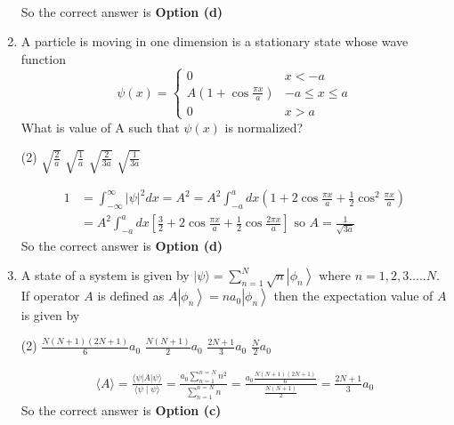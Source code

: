 \begin{enumerate}
\begin{answer}
$$\begin{aligned}
\end{aligned}
$$
So the correct answer is \textbf{Option (d)}
\end{answer}
\item A particle is moving in one dimension is a stationary state whose wave function
$$
\psi(x)=\left\{\begin{array}{lc}
0 & x<-a \\
A\left(1+\cos \frac{\pi x}{a}\right) & -a \leq x \leq a \\
0 & x>a
\end{array}\right.
$$
What is value of A such that $\psi(x)$ is normalized?
 \begin{tasks}(2)
	\task[\textbf{a.}] $\sqrt{\frac{2}{a}}$
	\task[\textbf{b.}]$\sqrt{\frac{1}{a}}$
	\task[\textbf{c.}] $\sqrt{\frac{2}{3 a}}$
	\task[\textbf{d.}] $\sqrt{\frac{1}{3 a}}$
\end{tasks}
\begin{answer}
	$$
	\begin{aligned}
	1&=\int_{-\infty}^{\infty}|\psi|^{2} d x=A^{2}=A^{2} \int_{-a}^{a} d x\left(1+2 \cos \frac{\pi x}{a}+\frac{1}{2} \cos ^{2} \frac{\pi x}{a}\right)\\
	&=A^{2} \int_{-a}^{a} d x\left[\frac{3}{2}+2 \cos \frac{\pi x}{a}+\frac{1}{2} \cos \frac{2 \pi x}{a}\right] \text { so } A=\frac{1}{\sqrt{3 a}}
\end{aligned}
$$
So the correct answer is \textbf{Option (d)}
\end{answer}
\item A state of a system is given by $|\psi\rangle=\sum_{n=1}^{N} \sqrt{n}\left|\phi_{n}\right\rangle$ where $n=1,2,3 \ldots . . N$. If operator $A$ is defined as $A\left|\phi_{n}\right\rangle=n a_{0}\left|\phi_{n}\right\rangle$ then the expectation value of $A$ is given by
 \begin{tasks}(2)
	\task[\textbf{a.}]$\frac{N(N+1)(2 N+1)}{6} a_{0}$
	\task[\textbf{b.}]$\frac{N(N+1)}{2} a_{0}$
	\task[\textbf{c.}]$\frac{2 N+1}{3} a_{0}$
	\task[\textbf{d.}]$\frac{N}{2} a_{0}$ 
\end{tasks}
\begin{answer}
	$$
	\begin{aligned}
	\langle A\rangle=\frac{\langle\psi|A| \psi\rangle}{\langle\psi \mid \psi\rangle}=\frac{a_{0} \sum_{n=1}^{n=N} n^{2}}{\sum_{n=1}^{n=N} n}=\frac{a_{0} \frac{N(N+1)(2 N+1)}{6}}{\frac{N(N+1)}{2}}=\frac{2 N+1}{3} a_{0}
\end{aligned}
$$
So the correct answer is \textbf{Option (c)}
\end{answer}

\end{enumerate}
